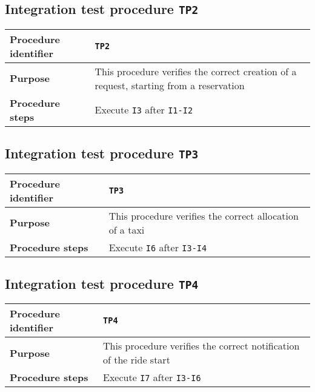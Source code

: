\subsection{Integration test procedure \normalfont\texttt{TP2}}

\begin{table*}[!h]\centering\begin{tabularx}{.9\textwidth}{ >{\bfseries}l X }\toprule%
Procedure identifier	&	\texttt{TP2}	\\\midrule
Purpose				&	This procedure verifies the correct creation of a request, starting from a reservation	\\\midrule
Procedure steps			&	Execute \texttt{I3} after \texttt{I1-I2}	\\
\bottomrule\end{tabularx}\end{table*}



\clearpage


\subsection{Integration test procedure \normalfont\texttt{TP3}}

\begin{table*}[!h]\centering\begin{tabularx}{.9\textwidth}{ >{\bfseries}l X }\toprule%
Procedure identifier	&	\texttt{TP3}	\\\midrule
Purpose				&	This procedure verifies the correct allocation of a taxi	\\\midrule
Procedure steps			&	Execute \texttt{I6} after \texttt{I3-I4}	\\
\bottomrule\end{tabularx}\end{table*}







\subsection{Integration test procedure \normalfont\texttt{TP4}}

\begin{table*}[!h]\centering\begin{tabularx}{.9\textwidth}{ >{\bfseries}l X }\toprule%
Procedure identifier	&	\texttt{TP4}	\\\midrule
Purpose				&	This procedure verifies the correct notification of the ride start	\\\midrule
Procedure steps			&	Execute \texttt{I7} after \texttt{I3-I6}		\\
\bottomrule\end{tabularx}\end{table*}

















